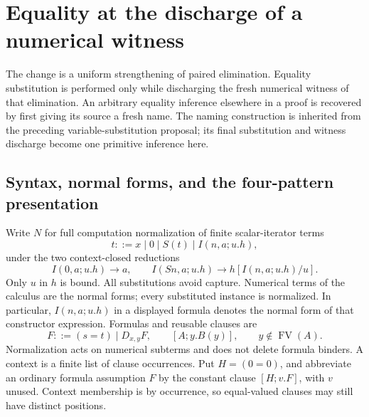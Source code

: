 
\section{Equality at the discharge of a numerical witness}
\label{fus:section}

The change is a uniform strengthening of paired elimination. Equality
substitution is performed only while discharging the fresh numerical witness
of that elimination. An arbitrary equality inference elsewhere in a proof is
recovered by first giving its source a fresh name. The naming construction is
inherited from the preceding variable-substitution proposal; its final
substitution and witness discharge become one primitive inference here.

\subsection{Syntax, normal forms, and the four-pattern presentation}

Write $N$ for full computation normalization of finite scalar-iterator terms
\[
 t::=x\mid 0\mid S(t)\mid I(n,a;u.h),
\]
under the two context-closed reductions
\[
 I(0,a;u.h)\longrightarrow a,
 \qquad
 I(Sn,a;u.h)\longrightarrow h[I(n,a;u.h)/u].
\]
Only $u$ in $h$ is bound. All substitutions avoid capture. Numerical terms
of the calculus are the normal forms; every substituted instance is normalized.
In particular, $I(n,a;u.h)$ in a displayed formula denotes the normal form of
that constructor expression. Formulas and reusable clauses are
\[
 F::=(s=t)\mid D_{x,y}F,
 \qquad [A;y.B(y)],\qquad y\notin\operatorname{FV}(A).
\]
Normalization acts on numerical subterms and does not delete formula binders.
A context is a finite list of clause occurrences. Put $H=(0=0)$, and abbreviate
an ordinary formula assumption $F$ by the constant clause $[H;v.F]$, with $v$
unused. Context membership is by occurrence, so equal-valued clauses may still
have distinct positions.

